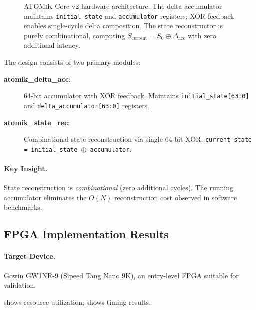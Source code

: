 \documentclass[11pt,letterpaper]{article}
\theoremstyle{plain}
\theoremstyle{definition}
\theoremstyle{remark}
\newcommand{\atomik}{\textsc{ATOMiK}}
\begin{document}
\begin{figure}[!htbp]
\caption{\atomik{} Core v2 hardware architecture. The delta accumulator maintains \texttt{initial\_state} and \texttt{accumulator} registers; XOR feedback enables single-cycle delta composition. The state reconstructor is purely combinational, computing $S_{\text{current}} = S_0 \oplus \Delta_{\text{acc}}$ with zero additional latency.}
\label{fig:hardware}
\end{figure}

The design consists of two primary modules:

\begin{description}
    \item[\textbf{atomik\_delta\_acc}:] 64-bit accumulator with XOR feedback. Maintains \texttt{initial\_state[63:0]} and \texttt{delta\_accumulator[63:0]} registers.

    \item[\textbf{atomik\_state\_rec}:] Combinational state reconstruction via single 64-bit XOR: \texttt{current\_state = initial\_state $\oplus$ accumulator}.
\end{description}

\paragraph{Key Insight.} State reconstruction is \emph{combinational} (zero additional cycles). The running accumulator eliminates the $O(N)$ reconstruction cost observed in software benchmarks.

\subsection{FPGA Implementation Results}

\paragraph{Target Device.} Gowin GW1NR-9 (Sipeed Tang Nano 9K), an entry-level FPGA suitable for validation.

 shows resource utilization;  shows timing results.
\end{document}
